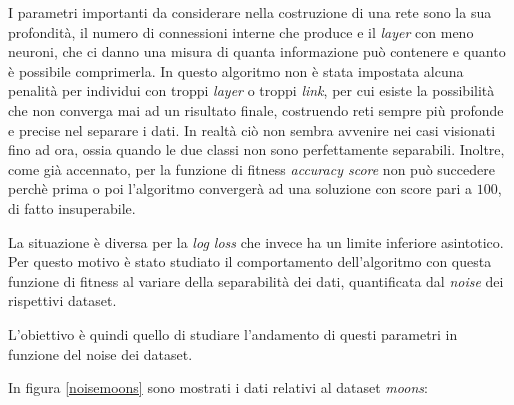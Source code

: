 \documentclass[12pt,a4paper]{report}
\begin{document}
I parametri importanti da considerare nella costruzione di una rete sono la sua profondità, il numero di connessioni interne che produce e il \textit{layer} con meno neuroni, che ci danno una misura di quanta informazione può contenere e quanto è possibile comprimerla.
In questo algoritmo non è stata impostata alcuna penalità per individui con troppi \textit{layer} o troppi \textit{link}, per cui esiste la possibilità che non converga mai ad un risultato finale, costruendo reti sempre più profonde e precise nel separare i dati.
In realtà ciò non sembra avvenire nei casi visionati fino ad ora, ossia quando le due classi non sono perfettamente separabili. 
Inoltre, come già accennato, per la funzione di fitness \textit{accuracy score} non può succedere perchè prima o poi l'algoritmo convergerà ad una soluzione con score pari a $100$\textdiscount, di fatto insuperabile.

La situazione è diversa per la \textit{log loss} che invece ha un limite inferiore asintotico. 
Per questo motivo è stato studiato il comportamento dell'algoritmo con questa funzione di fitness al variare della separabilità dei dati, quantificata dal \textit{noise} dei rispettivi dataset. 

L'obiettivo è quindi quello di studiare l'andamento di questi parametri in funzione del noise dei dataset.

In figura \ref{noisemoons} sono mostrati i dati relativi al dataset \textit{moons}:
\end{document}
